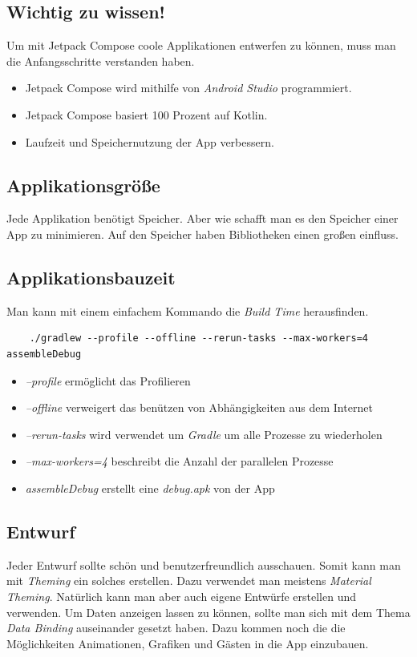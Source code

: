 \subsection{Wichtig zu wissen!}
\cite{Jetpack-Compose-Docu}
Um mit Jetpack Compose coole Applikationen entwerfen zu können, muss man die Anfangsschritte verstanden haben.

\begin{itemize}
    \item Jetpack Compose wird mithilfe von \textit{Android Studio} programmiert.
    \item Jetpack Compose basiert 100 Prozent auf Kotlin. 
    \item Laufzeit und Speichernutzung der App verbessern.
\end{itemize}

\subsection{Applikationsgröße}
Jede Applikation benötigt Speicher. Aber wie schafft man es den Speicher einer App zu minimieren. 
Auf den Speicher haben Bibliotheken einen großen einfluss. 

\subsection{Applikationsbauzeit}
\cite{Jetpack-Compose-Build}
Man kann mit einem einfachem Kommando die \textit{Build Time} herausfinden.
\begin{lstlisting}
    ./gradlew --profile --offline --rerun-tasks --max-workers=4 assembleDebug
\end{lstlisting}

\begin{itemize}
    \item \textit{--profile} ermöglicht das Profilieren
    \item \textit{--offline} verweigert das benützen von Abhängigkeiten aus dem Internet
    \item \textit{--rerun-tasks} wird verwendet um \textit{Gradle} um alle Prozesse zu wiederholen
    \item \textit{--max-workers=4} beschreibt die Anzahl der parallelen Prozesse \cite{Gradle-Max-Worker}
    \item \textit{assembleDebug} erstellt eine \textit{debug.apk} von der App
\end{itemize}


\subsection{Entwurf}
Jeder Entwurf sollte schön und benutzerfreundlich ausschauen. Somit kann man mit \textit{Theming} ein solches erstellen.
Dazu verwendet man meistens \textit{Material Theming}. Natürlich kann man aber auch eigene Entwürfe erstellen und verwenden.
Um Daten anzeigen lassen zu können, sollte man sich mit dem Thema \textit{Data Binding} auseinander gesetzt haben.
Dazu kommen noch die die Möglichkeiten Animationen, Grafiken und Gästen in die App einzubauen.


